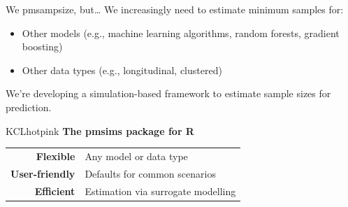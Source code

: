 \documentclass[11pt]{beamer}
\newcommand*{\colitem}[2]{%
    \item[\textcolor{#1}{\textbullet}] \textcolor{#1}{#2}
}
\newcommand{\sgap}{\vspace{0.5em}}
\newcommand{\bgap}{\vspace{0.8em}}
\newcommand*{\img}[1]{%
    \raisebox{-.3\baselineskip}{%
        \texttt{[image: \#1]}%
    }%
}
\begin{document}
\begin{frame}[t]{We \img{figures/heart.png} pmsampsize, but\ldots}
	\large
	\vspace{1em}
	We increasingly need to estimate minimum samples for:\ \sgap
	\begin{itemize}
		\colitem{KCLpurple}{Other models (e.g., machine learning algorithms, random
			forests, gradient boosting)}
		\colitem{KCLseablue}{Other data types (e.g., longitudinal, clustered)}
	\end{itemize}

	\vspace{1.5em}
	We're developing a simulation-based framework to estimate sample
	sizes for prediction.

	\begin{cbox}[colframe=KCLhotpink!50!black]{KCLhotpink}{}
		\RaggedRight
		{\Large \textbf{The pmsims package for R}}

        \bgap

		\begin{tabular}{rp{}}
			\textbf{Flexible}      & Any model or data type             \\
			\textbf{User-friendly} & Defaults for common scenarios      \\
			\textbf{Efficient}      & Estimation via surrogate modelling
		\end{tabular}
	\end{cbox}

\end{frame}
\end{document}
